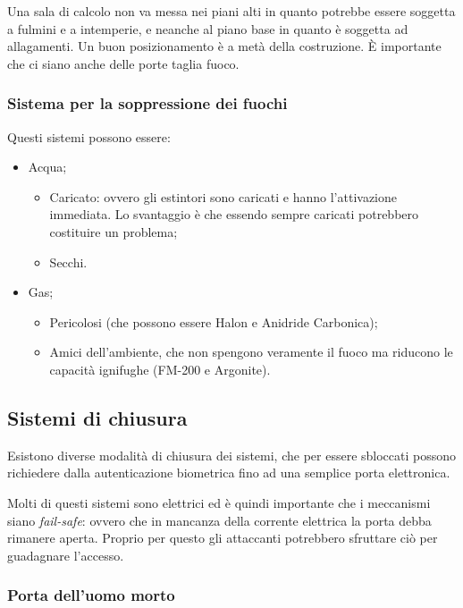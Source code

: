 Una sala di calcolo non va messa nei piani alti in quanto potrebbe essere 
soggetta a fulmini e a intemperie, e neanche al piano base in quanto è soggetta 
ad allagamenti. Un buon posizionamento è a metà della costruzione. È 
importante che ci siano anche delle porte taglia fuoco.

\subsubsection{Sistema per la soppressione dei fuochi}

Questi sistemi possono essere:
\begin{itemize}
\item Acqua;
\begin{itemize}
\item Caricato: ovvero gli estintori sono caricati e hanno l'attivazione 
immediata. Lo svantaggio è che essendo sempre caricati potrebbero costituire un 
problema;
\item Secchi.
\end{itemize}
\item Gas;
\begin{itemize}
\item Pericolosi (che possono essere Halon e Anidride Carbonica);
\item Amici dell'ambiente, che non spengono veramente il fuoco ma riducono le 
capacità ignifughe (FM-200 e Argonite).
\end{itemize}
\end{itemize}

\subsection{Sistemi di chiusura}

Esistono diverse modalità di chiusura dei sistemi, che per essere sbloccati 
possono richiedere dalla autenticazione biometrica fino ad una semplice 
porta elettronica.

Molti di questi sistemi sono elettrici ed è quindi importante che i 
meccanismi siano \textit{fail-safe}: ovvero che in mancanza della corrente 
elettrica la porta debba rimanere aperta. Proprio per questo gli attaccanti 
potrebbero sfruttare ciò per guadagnare l'accesso.

\subsubsection{Porta dell'uomo morto}

